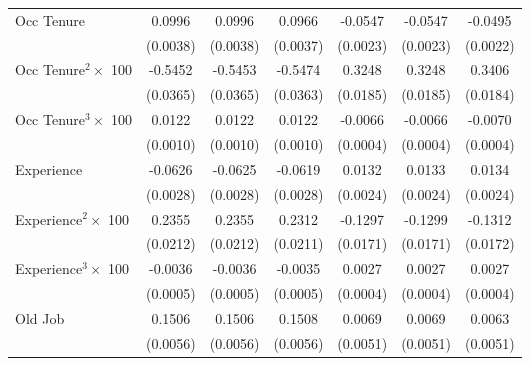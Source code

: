 {\begin{longtable}{l*{6}{c}}
Occ Tenure          &      0.0996\sym{***}&      0.0996\sym{***}&      0.0966\sym{***}&     -0.0547\sym{***}&     -0.0547\sym{***}&     -0.0495\sym{***}\\
                    &    (0.0038)         &    (0.0038)         &    (0.0037)         &    (0.0023)         &    (0.0023)         &    (0.0022)         \\
Occ Tenure$^2\times$ 100&     -0.5452\sym{***}&     -0.5453\sym{***}&     -0.5474\sym{***}&      0.3248\sym{***}&      0.3248\sym{***}&      0.3406\sym{***}\\
                    &    (0.0365)         &    (0.0365)         &    (0.0363)         &    (0.0185)         &    (0.0185)         &    (0.0184)         \\
Occ Tenure$^3\times$ 100&      0.0122\sym{***}&      0.0122\sym{***}&      0.0122\sym{***}&     -0.0066\sym{***}&     -0.0066\sym{***}&     -0.0070\sym{***}\\
                    &    (0.0010)         &    (0.0010)         &    (0.0010)         &    (0.0004)         &    (0.0004)         &    (0.0004)         \\
Experience          &     -0.0626\sym{***}&     -0.0625\sym{***}&     -0.0619\sym{***}&      0.0132\sym{***}&      0.0133\sym{***}&      0.0134\sym{***}\\
                    &    (0.0028)         &    (0.0028)         &    (0.0028)         &    (0.0024)         &    (0.0024)         &    (0.0024)         \\
Experience$^2\times$ 100&      0.2355\sym{***}&      0.2355\sym{***}&      0.2312\sym{***}&     -0.1297\sym{***}&     -0.1299\sym{***}&     -0.1312\sym{***}\\
                    &    (0.0212)         &    (0.0212)         &    (0.0211)         &    (0.0171)         &    (0.0171)         &    (0.0172)         \\
Experience$^3\times$ 100&     -0.0036\sym{***}&     -0.0036\sym{***}&     -0.0035\sym{***}&      0.0027\sym{***}&      0.0027\sym{***}&      0.0027\sym{***}\\
                    &    (0.0005)         &    (0.0005)         &    (0.0005)         &    (0.0004)         &    (0.0004)         &    (0.0004)         \\
Old Job             &      0.1506\sym{***}&      0.1506\sym{***}&      0.1508\sym{***}&      0.0069         &      0.0069         &      0.0063         \\
                    &    (0.0056)         &    (0.0056)         &    (0.0056)         &    (0.0051)         &    (0.0051)         &    (0.0051)         \\

\end{longtable}}
